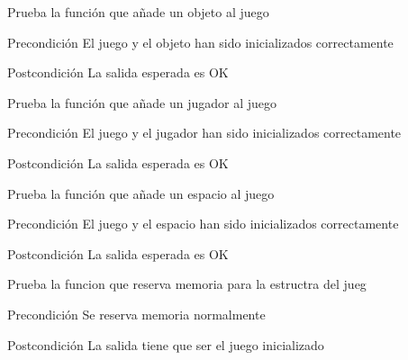 \begin{DoxyRefList}
\item[\label{test__test000068}%
\hypertarget{test__test000068}{}%
Global \hyperlink{game__test_8c_ac60415277fc72d0a231b17e482a6609b}{test1\-\_\-game\-\_\-add\-\_\-object} ()]Prueba la función que añade un objeto al juego \begin{DoxyPrecond}{Precondición}
El juego y el objeto han sido inicializados correctamente 
\end{DoxyPrecond}
\begin{DoxyPostcond}{Postcondición}
La salida esperada es O\-K  
\end{DoxyPostcond}

\item[\label{test__test000077}%
\hypertarget{test__test000077}{}%
Global \hyperlink{game__test_8c_a4adb115e4624c38738c938b999f6c949}{test1\-\_\-game\-\_\-add\-\_\-player} ()]Prueba la función que añade un jugador al juego \begin{DoxyPrecond}{Precondición}
El juego y el jugador han sido inicializados correctamente 
\end{DoxyPrecond}
\begin{DoxyPostcond}{Postcondición}
La salida esperada es O\-K  
\end{DoxyPostcond}

\item[\label{test__test000071}%
\hypertarget{test__test000071}{}%
Global \hyperlink{game__test_8c_a49b59f8e75a8a4375c98ded865f16fcc}{test1\-\_\-game\-\_\-add\-\_\-space} ()]Prueba la función que añade un espacio al juego \begin{DoxyPrecond}{Precondición}
El juego y el espacio han sido inicializados correctamente 
\end{DoxyPrecond}
\begin{DoxyPostcond}{Postcondición}
La salida esperada es O\-K  
\end{DoxyPostcond}

\item[\label{test__test000060}%
\hypertarget{test__test000060}{}%
Global \hyperlink{game__test_8c_a1d5c70cf073b025bb5d74413cecd929b}{test1\-\_\-game\-\_\-create} ()]Prueba la funcion que reserva memoria para la estructra del jueg \begin{DoxyPrecond}{Precondición}
Se reserva memoria normalmente 
\end{DoxyPrecond}
\begin{DoxyPostcond}{Postcondición}
La salida tiene que ser el juego inicializado  
\end{DoxyPostcond}


\end{DoxyRefList}
